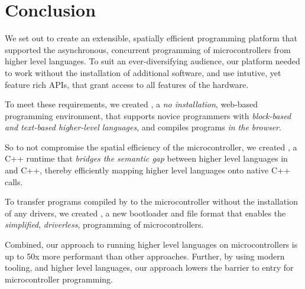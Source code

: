 \section{Conclusion}
\label{sec:conclude}

We set out to create an extensible, spatially efficient programming platform that supported the asynchronous, concurrent programming of microcontrollers from higher level languages. To suit an ever-diversifying audience, our platform needed to work without the installation of additional software, and use intutive, yet feature rich APIs, that grant access to all features of the hardware.

To meet these requirements, we created \MCN, a \emph{no installation}, web-based programming environment, that supports novice programmers with \emph{block-based and text-based higher-level languages}, and compiles programs \emph{in the browser}.

So to not compromise the spatial efficiency of the microcontroller, we created \CON, a C++ runtime that \emph{bridges the semantic gap} between higher level languages in \MC and C++, thereby efficiently mapping higher level languages onto native C++ calls.

To transfer programs compiled by \MC to the microcontroller without the installation of any drivers, we created \UFN, a new bootloader and file format that enables the \emph{simplified}, \emph{driverless}, programming of microcontrollers.

Combined, our approach to running higher level languages on microcontrollers is up to 50x more performant than other approaches. Further, by using modern tooling, and higher level languages, our approach lowers the barrier to entry for microcontroller programming.


